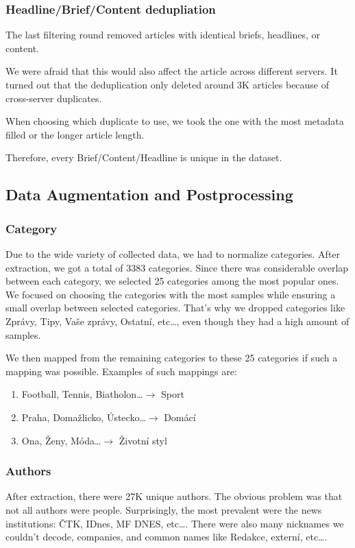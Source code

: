 \subsubsection{Headline/Brief/Content dedupliation}
The last filtering round removed articles with identical briefs, headlines, or content.

We were afraid that this would also affect the article across different servers.
It turned out that the deduplication only deleted around 3K articles
because of cross-server duplicates.

When choosing which duplicate to use, we took the one with the most metadata filled
or the longer article length.

Therefore, every Brief/Content/Headline is unique in the dataset.

\subsection{Data Augmentation and Postprocessing}

\subsubsection{Category}
\label{sec:category}
Due to the wide variety of collected data, we had to normalize categories.
After extraction, we got a total of 3383 categories.
Since there was considerable overlap between each category,
we selected 25 categories among the most popular ones.
We focused on choosing the categories with the most samples
while ensuring a small overlap between selected categories.
That's why we dropped categories like Zprávy, Tipy, Vaše zprávy, Ostatní, etc\dots,
even though they had a high amount of samples.


We then mapped from the remaining categories to these 25 categories if such a mapping was possible.
Examples of such mappings are:
\begin{enumerate}
    \item Football, Tennis, Biatholon\dots $\rightarrow$ Sport
    \item Praha, Domažlicko, Ústecko\dots $\rightarrow$ Domácí
    \item Ona, Ženy, Móda\dots $\rightarrow$ Životní styl
\end{enumerate}


\subsubsection{Authors}
\label{sec:authors}
After extraction, there were 27K unique authors.
The obvious problem was that not all authors were people.
Surprisingly, the most prevalent were the news institutions: ČTK, IDnes, MF DNES, etc\dots.
There were also many nicknames we couldn't decode, companies,
and common names like Redakce, externí, etc\dots.

